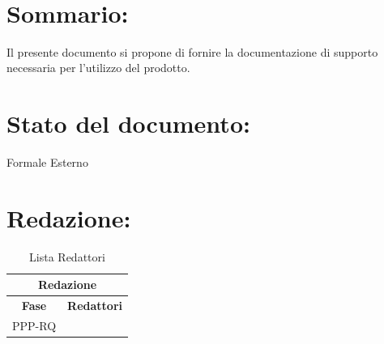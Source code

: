\begin{center} %
	\begin{Huge}	
				\textbf{\TITOLODOC}
			\\
	\end{Huge}
\end{center}

\section*{\LARGE Sommario:}
Il presente documento si propone di fornire la documentazione di supporto necessaria per l'utilizzo del prodotto.

\indent \indent

\section*{\LARGE Stato del documento:}
\indent \indent
	Formale Esterno

\section*{\LARGE Redazione:}
	\begin{table}[!h]
		\begin{center}
			\begin{tabular}
				{|c|c|}
				\hline
				\multicolumn{2}{|c|}{ \textbf{Redazione} } \\
				\hline
				\textbf{Fase} & \textbf{Redattori} \\
				\hline
				\multirow{2}{*}{PPP-RQ} & \\
										& \\
				\hline
			\end{tabular}
			\caption{Lista Redattori} %
			\label{tabredazione}
		\end{center}
	\end{table}
	
	
